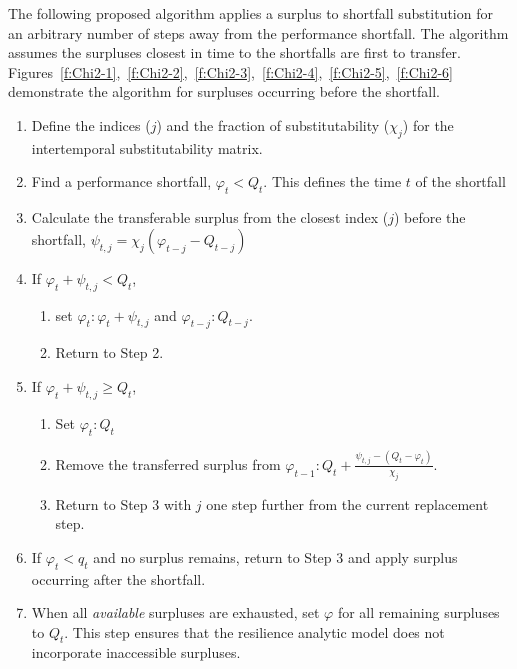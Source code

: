 \documentclass[preprint,12pt]{elsarticle}
\begin{document}
\noindent  The following proposed algorithm applies a
surplus to shortfall substitution for an arbitrary number of steps away from the performance
shortfall. The algorithm assumes the surpluses closest in time to the
shortfalls are first to
transfer. Figures~\ref{f:Chi2-1},~\ref{f:Chi2-2},~\ref{f:Chi2-3},~\ref{f:Chi2-4},~\ref{f:Chi2-5},~\ref{f:Chi2-6}
demonstrate the 
algorithm for surpluses 
occurring before the shortfall. 

\begin{enumerate}
\item Define the indices ($j$) and the fraction of substitutability
  ($\chi_j$) for the intertemporal substitutability matrix.
\item Find a performance shortfall, $\varphi_t < Q_t$. This defines
  the time $t$ of the shortfall 
\item Calculate the transferable surplus from the closest index ($j$) before the
  shortfall, $\psi_{t,j} = \chi_{j}(\varphi_{t-j}-Q_{t-j})$
\item If $\varphi_t + \psi_{t,j} < Q_t$,
  \begin{enumerate}
  \item set $\varphi_t:\varphi_t + \psi_{t,j}$ and
    $\varphi_{t-j}:Q_{t-j}$.
  \item Return to Step 2.
  \end{enumerate}
\item If $\varphi_t + \psi_{t,j} \geq Q_t$,
  \begin{enumerate}
  \item Set $\varphi_t:Q_t$
  \item Remove the transferred surplus from
    $\varphi_{t-1} : Q_t + \frac{\psi_{t,j} - (Q_t -
    \varphi_t)}{\chi_{j}}$.
  \item  Return to Step 3 with $j$ one step further from the current
    replacement step.
  \end{enumerate}
\item If $\varphi_t<q_t$ and no surplus remains, return to Step 3
  and apply surplus occurring after the shortfall.
\item When all \emph{available} surpluses are exhausted, set $\varphi$
  for all remaining surpluses to $Q_t$. This step ensures that
  the resilience analytic model does not incorporate inaccessible surpluses. 
\end{enumerate}
    
\end{document}
